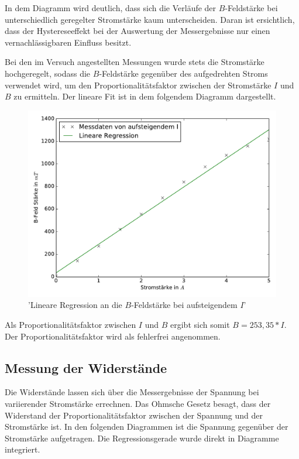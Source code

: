 In dem Diagramm wird deutlich, dass sich die Verläufe der $B$-Feldstärke bei
unterschiedlich geregelter Stromstärke kaum unterscheiden. Daran ist ersichtlich,
dass der Hystereseeffekt bei der Auswertung der Messergebnisse nur einen vernachlässigbaren
Einfluss besitzt.

Bei den im Versuch angestellten Messungen wurde stets die Stromstärke hochgeregelt,
sodass die $B$-Feldstärke gegenüber des aufgedrehten Stroms verwendet wird, um
den Proportionalitätsfaktor zwischen der Stromstärke $I$ und $B$ zu ermitteln.
Der lineare Fit ist in dem folgendem Diagramm dargestellt.

\begin{figure}
  \includegraphics[width=\textwidth]{lineareRegression.pdf}
  \caption{'Lineare Regression an die $B$-Feldstärke bei aufsteigendem $I$'}
  \label{fig:lineareRegression}
\end{figure}

Als Proportionalitätsfaktor zwischen $I$ und $B$ ergibt sich somit $B =
253,35 * I$. Der Proportionalitätsfaktor wird als fehlerfrei angenommen.

\subsection{Messung der Widerstände}

Die Widerstände lassen sich über die Messergebnisse der Spannung bei variierender
Stromstärke errechnen. Das Ohmsche Gesetz besagt, dass der Widerstand der
Proportionalitätsfaktor zwischen der Spannung und der Stromstärke ist.
In den folgenden Diagrammen ist die Spannung gegenüber der Stromstärke aufgetragen.
Die Regressionsgerade wurde direkt in Diagramme integriert.

